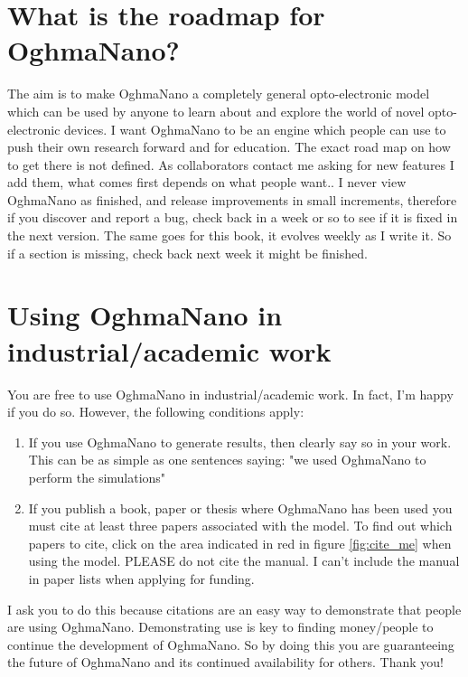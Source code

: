 \section{What is the roadmap for OghmaNano?}
The aim is to make OghmaNano a completely general opto-electronic model which can be used by anyone to learn about and explore the world of novel opto-electronic devices.  I want OghmaNano to be an engine which people can use to push their own research forward and for education. The exact road map on how to get there is not defined.  As collaborators contact me asking for new features I add them, what comes first depends on what people want.. I never view OghmaNano as finished, and release improvements in small increments, therefore if you discover and report a bug, check back in a week or so to see if it is fixed in the next version.  The same goes for this book, it evolves weekly as I write it. So if a section is missing, check back next week it might be finished.

\section{Using OghmaNano in industrial/academic work}
\label{sec:using_gvpdm}
You are free to use OghmaNano in industrial/academic work. In fact, I'm happy if you do so. However, the following conditions apply:
\begin{enumerate}
  \item If you use OghmaNano to generate results, then clearly say so in your work. This can be as simple as one sentences saying: "we used OghmaNano to perform the simulations"
  \item If you publish a book, paper or thesis where OghmaNano has been used you must cite at least three papers associated with the model.  To find out which papers to cite, click on the area indicated in red in figure \ref{fig:cite_me} when using the model. PLEASE do not cite the manual. I can't include the manual in paper lists when applying for funding.
\end{enumerate}

I ask you to do this because citations are an easy way to demonstrate that people are using OghmaNano. Demonstrating use is key to finding money/people to continue the development of OghmaNano.  So by doing this you are guaranteeing the future of OghmaNano and its continued availability for others.  Thank you!


